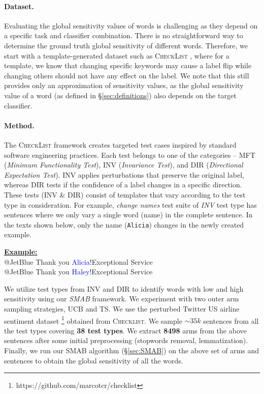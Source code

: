 \paragraph{Dataset.}Evaluating the global sensitivity values of words is challenging as they depend on a specific task and classifier combination. There is no straightforward way to determine the ground truth global sensitivity of different words. Therefore, we start with a template-generated dataset such as \textsc{CheckList} \cite{ribeiro-etal-2020-beyond}, where for a template, we know that changing specific keywords may cause a label flip while changing others should not have any effect on the label. We note that this still provides only an approximation of sensitivity values, as the global sensitivity value of a word (as defined in \S\ref{sec:definitions}) also depends on the target classifier.

\paragraph{Method.}The \textsc{CheckList} framework creates targeted test cases inspired by standard software engineering practices. Each test belongs to one of the categories -- MFT (\textit{Minimum Functionality Test}), INV (\textit{Invariance Test}), and DIR (\textit{Directional Expectation Test}). INV applies perturbations that preserve the original label, whereas DIR tests if the confidence of a label changes in a specific direction. These tests (INV \& DIR) consist of templates that vary according to the test type in consideration. For example, \textit{change names} test suite of \textit{INV} test type has sentences where we only vary a single word (name) in the complete sentence. In the texts shown below, only the name (\texttt{Alicia}) changes in the newly created example.

\begin{tcolorbox}[colback=white,colframe=red!75!black,left=1pt,right=1pt,top=0pt,bottom=0pt]
\textbf{\underline{Example: }}\\
    \-@JetBlue Thank you {\textcolor{blue}{Alicia}}!Exceptional Service\\
    \-@JetBlue Thank you {\textcolor{blue}{Haley}}!Exceptional Service 
\end{tcolorbox}
We utilize test types from INV and DIR to identify words with low and high sensitivity using our \textit{SMAB} framework. We experiment with two outer arm sampling strategies, UCB and TS. 
We use the perturbed Twitter US airline sentiment dataset \footnote{https://github.com/marcotcr/checklist} obtained from \textsc{Checklist}. We sample $\sim35k$ sentences from all the test types covering \textbf{38 test types}. We extract \textbf{8498} arms from the above sentences after some initial preprocessing (stopwords removal, lemmatization). Finally, we run our SMAB algorithm (\S\ref{sec:SMAB}) on the above set of arms and sentences to obtain the global sensitivity of all the words.

